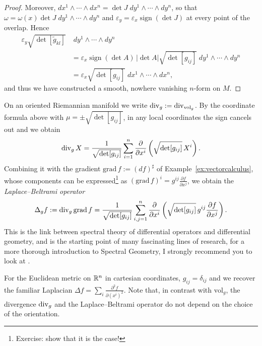 \begin{proof}
	Moreover, $dx^1\wedge\cdots\wedge dx^n = \det J\; dy^1\wedge\cdots\wedge dy^n$, so that $\omega = \omega(x)\det J\; dy^1\wedge\cdots\wedge dy^n$ and $\varepsilon_y = \varepsilon_x\operatorname{sign}(\det J)$ at every point of the overlap.
	Hence
	\begin{align}
		\varepsilon_y\sqrt{\det[\widetilde g_{kl}]}& \; dy^1\wedge\cdots\wedge dy^n \\
		& = \varepsilon_x\operatorname{sign}(\det A)\,|\det A| \sqrt{\det[g_{ij}]}\; dy^1\wedge\cdots\wedge dy^n \\
		& = \varepsilon_x\sqrt{\det[g_{ij}]}\; dx^1\wedge\cdots\wedge dx^n,
	\end{align}
	and thus we have constructed a smooth, nowhere vanishing $n$-form on $M$.
\end{proof}

On an oriented Riemannian manifold we write $\operatorname{div}_g := \operatorname{div}_{\mathrm{vol}_g}$.
By the coordinate formula above with $\mu = \pm\sqrt{\det[g_{ij}]}$, in any local coordinates the sign cancels out and we obtain
\begin{equation}
	\operatorname{div}_g X = \frac{1}{\sqrt{\det[g_{ij}]}}\sum_{i=1}^n\frac{\partial}{\partial x^i}\left(\sqrt{\det[g_{ij}]}\,X^i\right).
\end{equation}
Combining it with the gradient $\mathrm{grad}\, f := (df)^\sharp$ of Example~\ref{ex:vectorcalculus}, whose components can be expressed\footnote{Exercise: show that it is the case!} as $(\mathrm{grad}\, f)^i = g^{ij}\frac{\partial f}{\partial x^j}$, we obtain the \emph{Laplace--Beltrami operator}
\begin{equation}
	\Delta_g f := \operatorname{div}_g\mathrm{grad}\, f = \frac{1}{\sqrt{\det[g_{ij}]}}\sum_{i,j=1}^n\frac{\partial}{\partial x^i}\left(\sqrt{\det[g_{ij}]}\,g^{ij}\frac{\partial f}{\partial x^j}\right).
\end{equation}
This is the link between spectral theory of differential operators and differential geometry, and is the starting point of many fascinating lines of research, for a more thorough introduction to Spectral Geometry, I strongly recommend you to look at \cite{book:levitin}.

For the Euclidean metric on $\mathbb{R}^n$ in cartesian coordinates, $g_{ij} = \delta_{ij}$ and we recover the familiar Laplacian $\Delta f = \sum_i\frac{\partial^2f}{\partial (x^i)^2}$.
Note that, in contrast with $\mathrm{vol}_g$, the divergence $\operatorname{div}_g$ and the Laplace--Beltrami operator do not depend on the choice of the orientation.

